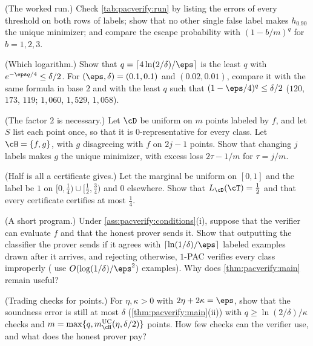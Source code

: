 \begin{refsection}
\begin{exercises}
\item \consolidation (The worked run.) Check \cref{tab:pacverify:run} by listing the errors of every threshold on both rows of labels; show that no other single false label makes $h_{0.90}$ the unique minimizer; and compare the escape probability with $(1-b/m)^q$ for $b=1,2,3$.\label{ex:pacverify:run}

\item \consolidation (Which logarithm.) Show that $q=\lceil4\ln(2/\delta)/\eps\rceil$ is the least $q$ with $e^{-\eps q/4}\le\delta/2$. For $(\eps,\delta)=(0.1,0.1)$ and $(0.02,0.01)$, compare it with the same formula in base $2$ and with the least $q$ such that $(1-\eps/4)^q\le\delta/2$ ($120$, $173$, $119$; $1{,}060$, $1{,}529$, $1{,}058$).\label{ex:pacverify:log}

\item \consolidation (The factor $2$ is necessary.) Let $\cD$ be uniform on $m$ points labeled by $f$, and let $S$ list each point once, so that it is $0$-representative for every class. Let $\cH=\{f,g\}$, with $g$ disagreeing with $f$ on $2j-1$ points. Show that changing $j$ labels makes $g$ the unique minimizer, with excess loss $2\tau-1/m$ for $\tau=j/m$.\label{ex:pacverify:tight}

\item \consolidation (Half is all a certificate gives.) Let the marginal be uniform on $[0,1]$ and the label be $1$ on $[0,\frac14)\cup[\frac12,\frac34)$ and $0$ elsewhere. Show that $L_\cD(\cT)=\frac12$ and that every certificate certifies at most $\frac14$.\label{ex:pacverify:half}

\item \consolidation (A short program.) Under \cref{ass:pacverify:conditions}(i), suppose that the verifier can evaluate $f$ and that the honest prover sends it. Show that outputting the classifier the prover sends if it agrees with $\lceil\ln(1/\delta)/\eps\rceil$ labeled examples drawn after it arrives, and rejecting otherwise, $1$-PAC verifies every class improperly (\textcite[Remark~4.2]{GoldwasserEtAl2021} use $O(\log(1/\delta)/\eps^2)$ examples). Why does \cref{thm:pacverify:main} remain useful?\label{ex:pacverify:improper}

\item \variation (Trading checks for points.) For $\eta,\kappa>0$ with $2\eta+2\kappa=\eps$, show that the soundness error is still at most $\delta$ (\cref{thm:pacverify:main}(ii)) with $q\ge\ln(2/\delta)/\kappa$ checks and $m=\max\{q,\pacverifyuc(\eta,\delta/2)\}$ points. How few checks can the verifier use, and what does the honest prover pay?\label{ex:pacverify:trade}


\end{exercises}
\end{refsection}
